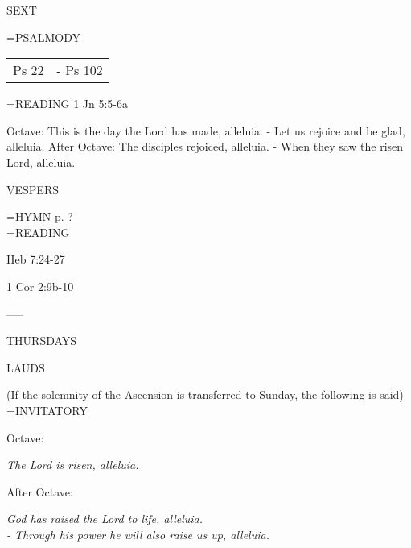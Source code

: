 \begin{flushleft}\normalsize SEXT\\\end{flushleft}
\hangindent=\parindent \small{PSALMODY}
\begin{center}
\begin{tabular}{ l l }
Ps 22 &  - Ps 102\\
\end{tabular}
\end{center}		

\hangindent=\parindent \small{READING}    1 Jn 5:5-6a \textbf{   }

Octave:	This is the day the Lord has made, alleluia.
		- Let us rejoice and be glad, alleluia.
After Octave:	The disciples rejoiced, alleluia.
		- When they saw the risen Lord, alleluia.

\begin{flushleft}\normalsize VESPERS\\\end{flushleft}
\hangindent=\parindent \small{\uppercase{HYMN} p.  ?\\}
\hangindent=\parindent \small READING
\begin{description}[labelindent=\parindent, leftmargin=*]
\item [1st-6th Week:]     Heb 7:24-27 \textbf{    }
\item [7th Week:]     1 Cor 2:9b-10 \textbf{    }
\end{description}

-----
\begin{center}
\normalsize THURSDAYS
\end{center}

\begin{flushleft}\normalsize LAUDS\\\end{flushleft}
(If the solemnity of the Ascension is transferred to Sunday, the following is said)
\hangindent=\parindent \small{INVITATORY}
\begin{center}
\end{center}Octave:\begin{center}\textit{	The Lord is risen, alleluia.\\}
\end{center}After Octave:\begin{center}\textit{	God has raised the Lord to life, alleluia.\\}
\textit{		- Through his power he will also raise us up, alleluia.\\}
\end{center}

